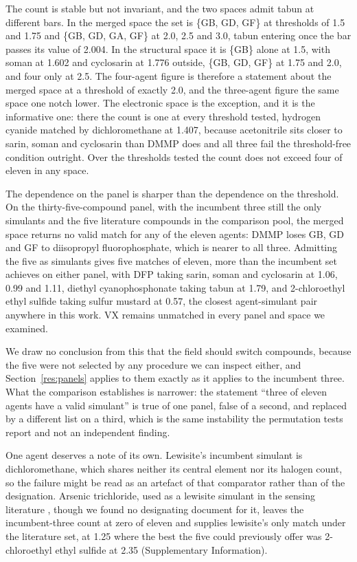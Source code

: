 \documentclass[1p,times]{elsarticle}
\begin{document}
The count is stable but not invariant, and the two spaces admit tabun at
different bars. In the merged space the set is \{GB, GD, GF\} at thresholds of
1.5 and 1.75 and \{GB, GD, GA, GF\} at 2.0, 2.5 and 3.0, tabun entering once the
bar passes its value of 2.004. In the structural space it is \{GB\} alone at 1.5,
with soman at 1.602 and cyclosarin at 1.776 outside, \{GB, GD, GF\} at 1.75 and
2.0, and four only at 2.5. The four-agent figure is therefore a statement about
the merged space at a threshold of exactly 2.0, and the three-agent figure the
same space one notch lower. The electronic
space is the exception, and it is the informative one: there the count is one at
every threshold tested, hydrogen cyanide matched by dichloromethane at 1.407,
because acetonitrile sits closer to sarin, soman and cyclosarin than DMMP does
and all three fail the threshold-free condition outright. Over the thresholds
tested the count does not exceed four of eleven in any space.

The dependence on the panel is sharper than the dependence on the threshold. On
the thirty-five-compound panel, with the incumbent three still the only
simulants and the five literature compounds in the comparison pool, the merged
space returns no valid match for any of the eleven agents: DMMP loses GB, GD and
GF to diisopropyl fluorophosphate, which is nearer to all three. Admitting the
five as simulants gives five matches of eleven, more than the incumbent set
achieves on either panel, with DFP taking sarin, soman and cyclosarin at 1.06,
0.99 and 1.11, diethyl cyanophosphonate taking tabun at 1.79, and
2-chloroethyl ethyl sulfide taking sulfur mustard at 0.57, the closest
agent-simulant pair anywhere in this work. VX remains unmatched in every panel
and space we examined.

We draw no conclusion from this that the field should switch compounds, because
the five were not selected by any procedure we can inspect either, and
Section~\ref{res:panels} applies to them exactly as it applies to the incumbent
three. What the comparison establishes is narrower: the statement ``three of
eleven agents have a valid simulant'' is true of one panel, false of a second,
and replaced by a different list on a third, which is the same instability the
permutation tests report and not an independent finding.

One agent deserves a note of its own. Lewisite's incumbent simulant is
dichloromethane, which shares neither its central element nor its halogen
count, so the failure might be read as an artefact of that comparator rather
than of the designation. Arsenic trichloride, used as a lewisite
simulant in the sensing literature \cite{lee2016lewisite}, though we found
no designating document for it, leaves the incumbent-three count at zero of
eleven and supplies lewisite's only match under the literature set, at 1.25
where the best the five could previously offer was 2-chloroethyl ethyl
sulfide at 2.35 (Supplementary Information).
\end{document}
